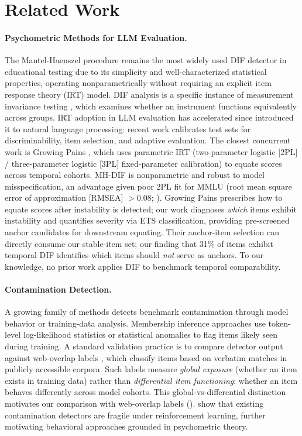 \section{Related Work}
\label{sec:related_work}

\paragraph{Psychometric Methods for LLM Evaluation.}
The Mantel-Haenszel procedure \citep{holland1988mh} remains the most widely used DIF detector in educational testing due to its simplicity and well-characterized statistical properties, operating nonparametrically without requiring an explicit item response theory (IRT) model. DIF analysis is a specific instance of measurement invariance testing \citep{meredith1993invariance}, which examines whether an instrument functions equivalently across groups. IRT adoption in LLM evaluation has accelerated since \citet{lalor2019irt} introduced it to natural language processing: recent work calibrates test sets for discriminability, item selection, and adaptive evaluation. The closest concurrent work is Growing Pains \citep{habba2026growingpains}, which uses parametric IRT (two-parameter logistic [2PL] / three-parameter logistic [3PL] fixed-parameter calibration) to equate scores across temporal cohorts. MH-DIF is nonparametric and robust to model misspecification, an advantage given poor 2PL fit for MMLU (root mean square error of approximation [RMSEA] $> 0.08$; ). Growing Pains prescribes how to equate scores after instability is detected; our work diagnoses \emph{which} items exhibit instability and quantifies severity via ETS classification, providing pre-screened anchor candidates for downstream equating. Their anchor-item selection can directly consume our stable-item set; our finding that 31\% of items exhibit temporal DIF identifies which items should \emph{not} serve as anchors. To our knowledge, no prior work applies DIF to benchmark temporal comparability.

\paragraph{Contamination Detection.}
A growing family of methods detects benchmark contamination through model behavior or training-data analysis. Membership inference approaches use token-level log-likelihood statistics \citep{shi2024mink} or statistical anomalies \citep{dekoninck2024constat} to flag items likely seen during training. A standard validation practice is to compare detector output against web-overlap labels \citep{li2024contamination}, which classify items based on verbatim matches in publicly accessible corpora. Such labels measure \emph{global exposure} (whether an item exists in training data) rather than \emph{differential item functioning}: whether an item behaves differently across model cohorts. This global-vs-differential distinction motivates our comparison with web-overlap labels (). \citet{wang2026fragility} show that existing contamination detectors are fragile under reinforcement learning, further motivating behavioral approaches grounded in psychometric theory.

